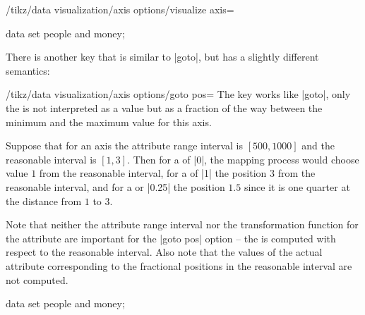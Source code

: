 \begin{key}{/tikz/data visualization/axis options/visualize axis=}
\begin{codeexample}[]
\tikz \datavisualization [
    our system,
    x axis={attribute=time, length=4cm},
    left axis ={attribute=money},
    right axis={attribute=people},
    visualize as line/.list={people 1, people 2, money 1, money 2}]
  data set {people and money};  
\end{codeexample}

  There is another key that is similar to |goto|, but has a slightly
  different semantics:
  \begin{key}{/tikz/data visualization/axis options/goto pos=}
    The key works like |goto|, only the  is not
    interpreted as a value but as a fraction of the way between the
    minimum and the maximum value for this axis.

    Suppose that for an axis the attribute range interval is
    $[500,1000]$ and the reasonable interval is $[1,3]$. Then for a
     of |0|, the mapping process would choose value
    $1$ from the reasonable interval, for a  of |1| the
    position $3$ from the reasonable interval, and for a
     or |0.25| the position $1.5$ since it is one
    quarter at the distance from $1$ to $3$.

    Note that neither the attribute range interval nor the
    transformation function for the attribute are important for the
    |goto pos| option -- the  is computed with respect
    to the reasonable interval. Also note that the values of the
    actual attribute corresponding to the fractional positions in the
    reasonable interval are not computed.
\begin{codeexample}[]
\tikz \datavisualization [
    our system,
    x axis={attribute=time, length=4cm},
    left axis ={attribute=money},
    right axis={attribute=people},
    visualize as line/.list={people 1, people 2, money 1, money 2}]
  data set {people and money};  
\end{codeexample}
  \end{key}


\end{key}
